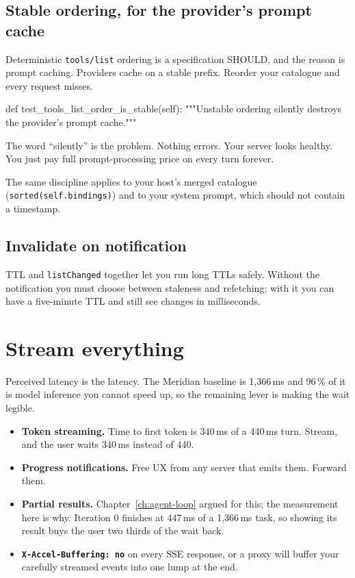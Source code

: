 \subsection{Stable ordering, for the provider's prompt cache}

Deterministic \texttt{tools/list} ordering is a specification SHOULD, and the
reason is prompt caching. Providers cache on a stable prefix. Reorder your
catalogue and every request misses.

\begin{py}
def test_tools_list_order_is_stable(self):
    """Unstable ordering silently destroys the provider's prompt cache."""
\end{py}

The word ``silently'' is the problem. Nothing errors. Your server looks healthy.
You just pay full prompt-processing price on every turn forever.

The same discipline applies to your host's merged catalogue
(\texttt{sorted(self.bindings)}) and to your system prompt, which should not
contain a timestamp.

\subsection{Invalidate on notification}

TTL and \texttt{listChanged} together let you run long TTLs safely. Without the
notification you must choose between staleness and refetching; with it you can
have a five-minute TTL and still see changes in milliseconds.

\section{Stream everything}

Perceived latency is the latency. The Meridian baseline is 1,366\,ms and 96\,\%
of it is model inference you cannot speed up, so the remaining lever is making
the wait legible.

\begin{itemize}[leftmargin=1.6em, itemsep=3pt]
\item \textbf{Token streaming.} Time to first token is 340\,ms of a 440\,ms
turn. Stream, and the user waits 340\,ms instead of 440.
\item \textbf{Progress notifications.} Free UX from any server that emits them.
Forward them.
\item \textbf{Partial results.} Chapter~\ref{ch:agent-loop} argued for this;
the measurement here is why. Iteration 0 finishes at 447\,ms of a 1,366\,ms
task, so showing its result buys the user two thirds of the wait back.
\item \textbf{\texttt{X-Accel-Buffering: no}} on every SSE response, or a proxy
will buffer your carefully streamed events into one lump at the end.
\end{itemize}

